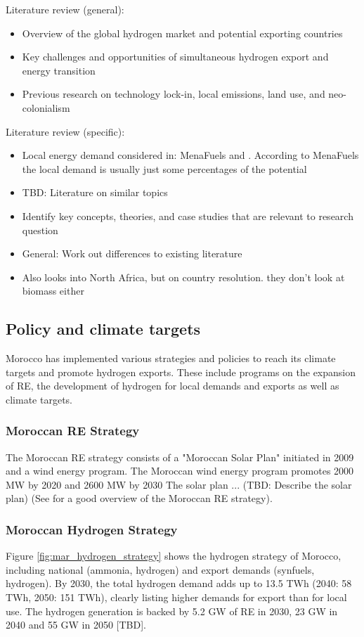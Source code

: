 Literature review (general):
\begin{itemize}
    \item Overview of the global hydrogen market and potential exporting countries
    \item Key challenges and opportunities of simultaneous hydrogen export and energy transition
    \item Previous research on technology lock-in, local emissions, land use, and neo-colonialism
\end{itemize}

Literature review (specific):
\begin{itemize}
    \item Local energy demand considered in: MenaFuels and \cite{Hampp2021}. According to MenaFuels the local demand is usually just some percentages of the potential
    \item TBD: Literature on similar topics 
    \item Identify key concepts, theories, and case studies that are relevant to research question
    \item General: Work out differences to existing literature
    \item \cite{Zwaan2021} Also looks into North Africa, but on country resolution. they don't look at biomass either
\end{itemize}


\subsection{Policy and climate targets}
\label{subsec:policyandtargets}
Morocco has implemented various strategies and policies to reach its climate targets and promote hydrogen exports. 
These include programs on the expansion of RE, the development of hydrogen for local demands and exports as well as climate targets.

\subsubsection{Moroccan RE Strategy}
The Moroccan RE strategy consists of a "Moroccan Solar Plan" initiated in 2009 \cite[p. 2]{Boulakhbar2020}
and a wind energy program.
The Moroccan wind energy program promotes 2000 MW by 2020 and 2600 MW by 2030 \cite[p. 4]{Boulakhbar2020}
The solar plan ... (TBD: Describe the solar plan)
(See \cite[p. 13]{Ersoy2022} for a good overview of the Moroccan RE strategy).

\subsubsection{Moroccan Hydrogen Strategy}
Figure \ref{fig:mar_hydrogen_strategy} shows the hydrogen strategy of Morocco, including
national (ammonia, hydrogen) and export demands (synfuels, hydrogen).
By 2030, the total hydrogen demand adds up to 13.5 TWh (2040: 58 TWh, 2050: 151 TWh), 
clearly listing higher demands for export than for local use. The hydrogen generation is backed by 5.2 GW of RE in 2030, 23 GW in 2040 and 55 GW in 2050 [TBD].


